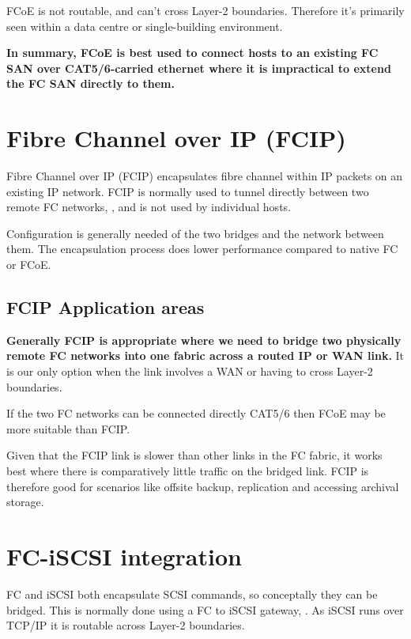 FCoE is not routable, and can't cross Layer-2 boundaries. Therefore it's
primarily seen within a data centre or single-building environment.

\textbf{In summary, FCoE is best used to connect hosts to an existing FC
SAN over CAT5/6-carried ethernet where it is impractical to extend the
FC SAN directly to them.}

\section{Fibre Channel over IP (FCIP)}
\label{sec:fibre-channel-over-ip}

Fibre Channel over IP (FCIP) encapsulates fibre channel within IP
packets on an existing IP network. FCIP is normally used to tunnel
directly between two remote FC networks, , and is not used by individual
hosts.


Configuration is generally needed of the two bridges and the network
between them. The encapsulation process does lower performance compared
to native FC or FCoE.

\subsection{FCIP Application areas}
\label{sec:fcip-application-areas}

\textbf{Generally FCIP is appropriate where we need to bridge two
physically remote FC networks into one fabric across a routed IP or WAN
link.} It is our only option when the link involves a WAN or having to
cross Layer-2 boundaries.

If the two FC networks can be connected directly CAT5/6 then FCoE may be
more suitable than FCIP.

Given that the FCIP link is slower than other links in the FC fabric, it
works best where there is comparatively little traffic on the bridged
link. FCIP is therefore good for scenarios like offsite backup,
replication and accessing archival storage.

\section{FC-iSCSI integration}
\label{sec:fc-iscsi-integration}

FC and iSCSI both encapsulate SCSI commands, so conceptally they can be
bridged. This is normally done using a FC to iSCSI gateway, . As iSCSI
runs over TCP/IP it is routable across Layer-2 boundaries.

